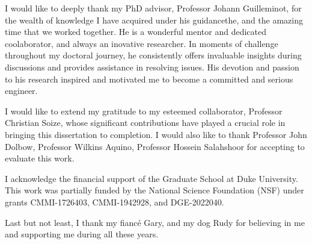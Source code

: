 \acknowledgements

I would like to deeply thank my PhD advisor, Professor Johann Guilleminot, for the wealth of knowledge I have acquired under his guidancethe, and the amazing time that we worked together. He is a wonderful mentor and dedicated coolaborator, and always an inovative researcher. In moments of challenge throughout my doctoral journey, he consistently offers invaluable insights during discussions and provides assistance in resolving issues. His devotion and passion to his research inspired and motivated me to become a committed and serious engineer.

I would like to extend my gratitude to my esteemed collaborator, Professor Christian Soize, whose significant contributions have played a crucial role in bringing this dissertation to completion. I would also like to thank Professor John Dolbow, Professor Wilkins Aquino, Professor Hossein Salahshoor for accepting to evaluate this work.

I acknowledge the financial support of the Graduate School at Duke University. This work was partially funded by the National Science Foundation (NSF) under grants CMMI-1726403, CMMI-1942928, and DGE-2022040.

Last but not least, I thank my fiancé Gary, and my dog Rudy for believing in me and supporting me during all these years.